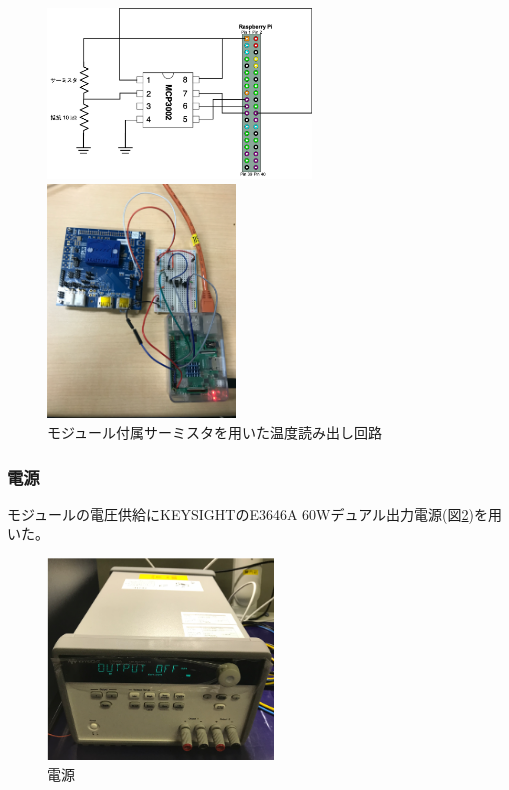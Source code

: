 \begin{figure}[h]\centering
  \begin{minipage}{0.5\hsize}
    \includegraphics[width=7cm]{temp_circit}
  \end{minipage}
  \begin{minipage}{0.4\hsize}
    \includegraphics[width=5cm]{temp_circit_pic}
  \end{minipage}
\caption[モジュール付属サーミスタを用いた温度読み出し回路]{モジュール付属サーミスタを用いた温度読み出し回路}
\label{demo_temp_circit_pic}
\end{figure}

\subsubsection{電源}
モジュールの電圧供給にKEYSIGHTのE3646A 60Wデュアル出力電源\cite{5-1}(図\ref{demo_power_supply})を用いた。
\begin{figure}[h]\centering
\includegraphics[width=6cm]{power_supply}
\caption[電源]{電源}
\label{demo_power_supply}
\end{figure}

